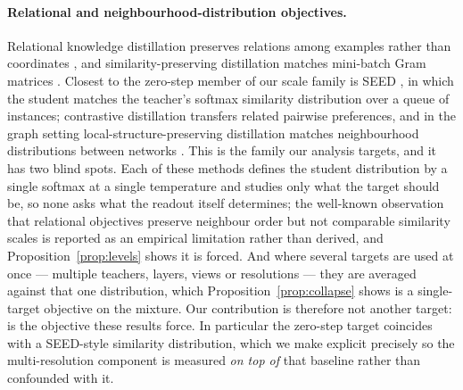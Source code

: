 \paragraph{Relational and neighbourhood-distribution objectives.}
Relational knowledge distillation preserves relations among examples rather than
coordinates \citep{park2019rkd}, and similarity-preserving distillation matches mini-batch
Gram matrices \citep{tung2019sp}. Closest to the zero-step member of our scale family is
SEED \citep{fang2021seed}, in which the student matches the teacher's softmax similarity
distribution over a queue of instances; contrastive distillation
\citep{tian2020crd,gao2021distilcse,xu2023distillcse} transfers related pairwise
preferences, and in the graph setting local-structure-preserving distillation matches
neighbourhood distributions between networks \citep{yang2020lsp,zhang2022glnn}. This is the
family our analysis targets, and it has two blind spots. Each of these methods defines the
student distribution by a single softmax at a single temperature and studies only what the
target should be, so none asks what the readout itself determines; the well-known observation
that relational objectives preserve neighbour order but not comparable similarity scales is
reported as an empirical limitation rather than derived, and
Proposition~\ref{prop:levels} shows it is forced. And where several targets are used at once
--- multiple teachers, layers, views or resolutions --- they are averaged against that one
distribution, which Proposition~\ref{prop:collapse} shows is a single-target objective on the
mixture. Our contribution is therefore not another target: \method is the objective these
results force. In particular the zero-step target coincides with a SEED-style similarity
distribution, which we make explicit precisely so the multi-resolution component is measured
\emph{on top of} that baseline rather than confounded with it.


